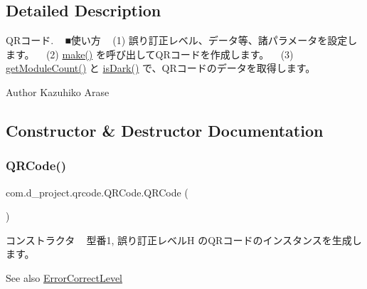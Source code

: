 \subsection{Detailed Description}
Q\+Rコード. ~\newline
■使い方 ~\newline
(1) 誤り訂正レベル、データ等、諸パラメータを設定します。 ~\newline
(2) \hyperlink{classcom_1_1d__project_1_1qrcode_1_1_q_r_code_a7e01d7c43b72d913ef3e3369bb8af4df}{make()} を呼び出して\+Q\+Rコードを作成します。 ~\newline
(3) \hyperlink{classcom_1_1d__project_1_1qrcode_1_1_q_r_code_a3cb1e7626961e1e5f02e249cc4dfb9f7}{get\+Module\+Count()} と \hyperlink{classcom_1_1d__project_1_1qrcode_1_1_q_r_code_a9e31b998c5437dd6780b3c0d4ec97497}{is\+Dark()} で、\+Q\+Rコードのデータを取得します。 ~\newline
 \begin{DoxyAuthor}{Author}
Kazuhiko Arase 
\end{DoxyAuthor}


\subsection{Constructor \& Destructor Documentation}
\mbox{\label{classcom_1_1d__project_1_1qrcode_1_1_q_r_code_a699e462d3798ba2108fb799663ad33d0}} 
\subsubsection{\texorpdfstring{Q\+R\+Code()}{QRCode()}}
{\footnotesize\ttfamily com.\+d\+\_\+project.\+qrcode.\+Q\+R\+Code.\+Q\+R\+Code (\begin{DoxyParamCaption}{ }\end{DoxyParamCaption})\hspace{0.3cm}{\ttfamily [inline]}}

コンストラクタ ~\newline
型番1, 誤り訂正レベルH の\+Q\+Rコードのインスタンスを生成します。 \begin{DoxySeeAlso}{See also}
\hyperlink{interfacecom_1_1d__project_1_1qrcode_1_1_error_correct_level}{Error\+Correct\+Level} 
\end{DoxySeeAlso}


